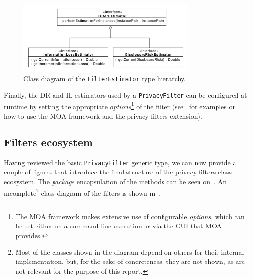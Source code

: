 \begin{figure}[h]
	\centering
	\includegraphics[width=0.8\textwidth]{figures/class_Estimators.pdf}
	\caption[\texttt{FilterEstimator} type hierarchy diagram.]{Class diagram of the \texttt{FilterEstimator} type hierarchy.}
	\label{fig:estimators-uml}
\end{figure}

Finally, the DR and IL estimators used by a \texttt{PrivacyFilter} can be configured at runtime by setting the appropriate \textit{options}\footnote{The MOA framework makes extensive use of configurable \textit{options}, which can be set either on a command line execution or via the GUI that MOA provides.} of the filter (see~ for examples on how to use the MOA framework and the privacy filters extension).

\subsection{Filters ecosystem}
\label{Implementation:PrivacyFilter:Ecosystem}

Having reviewed the basic \texttt{PrivacyFilter} generic type, we can now provide a couple of figures that introduce the final structure of the privacy filters class ecosystem. The \textit{package} encapsulation of the methods can be seen on~. An incomplete\footnote{Most of the classes shown in the diagram depend on others for their internal implementation, but, for the sake of concreteness, they are not shown, as are not relevant for the purpose of this report.} class diagram of the filters is shown in~.

